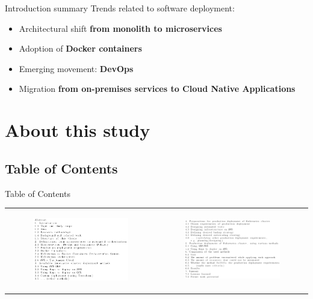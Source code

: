 \documentclass{beamer}
\begin{document}
\begin{frame}{Introduction summary}%
Trends related to software deployment:
\begin{itemize}
\item Architectural shift {\bfseries from monolith to microservices}
\item Adoption of {\bfseries Docker containers}
\item Emerging movement: {\bfseries DevOps}
\item Migration {\bfseries from on-premises services to Cloud Native Applications}
\end{itemize}
\end{frame}

\section{About this study}
\subsection{Table of Contents}
\begin{frame}{Table of Contents}%
\begin{center}
\begin{tabular}{@{}  l  l }
	\begin{figure}
		\includegraphics[width=5.5cm]{figures/table-of-c1.png}
		\label{fig:table-of-c1}
	\end{figure} &
	\begin{figure}
		\includegraphics[width=5.5cm]{figures/table-of-c2.png}
		\label{fig:table-of-c2}
	\end{figure} \\
	\end{tabular}
\end{center}
\end{frame}
\end{document}
